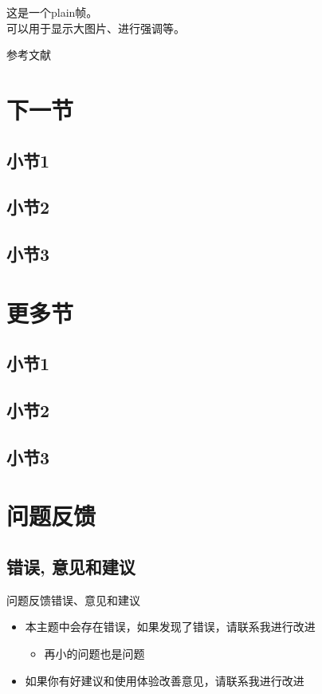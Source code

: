 \documentclass[t, aspectratio=169]{ctexbeamer}
\begin{document}
\begin{frame}[plain]
  \begin{center}
    这是一个plain帧。\\
    可以用于显示大图片、进行强调等。
  \end{center}
\end{frame}

\begin{frame}[allowframebreaks]{参考文献}
  \nocite{*}  
  \printbibliography[heading=bibliography,title=参考文献]
\end{frame}

\section{下一节}
\subsection{小节1}
\subsection{小节2}
\subsection{小节3}
\section{更多节}
\subsection{小节1}
\subsection{小节2}
\subsection{小节3}

\section{问题反馈}
\subsection{错误, 意见和建议}
\begin{frame}{问题反馈}{错误、意见和建议}
  \begin{itemize}
  \item 本主题中会存在错误，如果发现了错误，请联系我进行改进
    \begin{itemize}
    \item \alert{再小的问题也是问题}
    \end{itemize}
  \item 如果你有好建议和使用体验改善意见，请联系我进行改进
  \end{itemize}
\end{frame}
\end{document}
